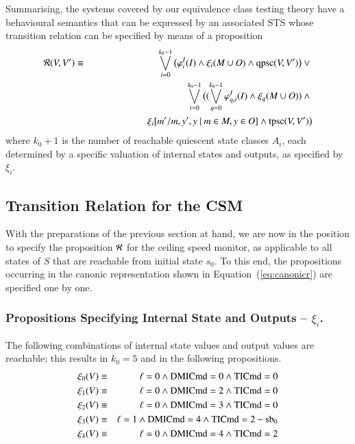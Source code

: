 Summarising, the   systems covered by our equivalence class testing theory have a behavioural semantics that can be expressed by an associated STS whose transition relation can be specified by means of a proposition
\begin{eqnarray}\label{eq:canonicr}
{\cal R}(V,V') & \equiv & \bigvee_{i=0}^{k_0-1}\big( \varphi_i^I(I) \wedge \xi_i(M\cup O) \wedge \qpsc(V,V')\big) \vee {}
\\ & & \bigvee_{i=0}^{k_0-1}\big((\bigvee_{q=0}^{k_0-1}\varphi_{q,i}^I(I)\wedge\xi_q(M\cup O)) 
\wedge {}
\\ & & \hspace*{20mm}
\xi_{i}[m'/m,y',y~|~m\in M, y\in O] \wedge \tpsc(V,V') \big)
\end{eqnarray}
where $k_0 +1$ is the number of reachable quiescent state classes $A_i$, each determined by a specific valuation of internal states and outputs, as specified by~$\xi_i$.

\subsection{Transition Relation for the CSM}\label{sec:transrelcsm}

 
With the  preparations of the previous section at hand, we are now in the position to specify the proposition ${\cal R}$ for the ceiling speed monitor, as 
applicable to all states of $S$ that are reachable from   initial state  $s_0$.
To this end, the propositions occurring in the canonic representation shown in Equation~(\ref{eq:canonicr}) are specified one by one.

\subsubsection{Propositions Specifying Internal State and Outputs -- $\xi_i$.}
The following combinations of internal state values and output values are reachable; this results in $k_0 = 5$ and in the following propositions.
\footnotesize
\begin{eqnarray*}
\xi_0(V) &  \equiv  & \ell=0  \wedge \text{DMICmd} =0 \wedge \text{TICmd}=0
\\
\xi_1(V) & \equiv  & \ell=0 \wedge  \text{DMICmd}=2 \wedge \text{TICmd}=0 
\\
\xi_2(V) &  \equiv  &   \ell=0  \wedge \text{DMICmd}=3 \wedge \text{TICmd}=0
 \\
\xi_3(V) & \equiv &    \ell=1 \wedge \text{DMICmd}=4 \wedge \text{TICmd}=2 - \text{sb}_0
\\ 
\xi_4(V) & \equiv &  \ell=0  \wedge \text{DMICmd}=4 \wedge \text{TICmd}=2
\end{eqnarray*}
\normalsize


